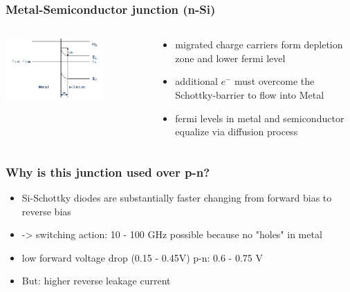 \documentclass[aspectratio=1610, 9pt]{beamer}
\begin{document}
\begin{frame}\frametitle{Metal-Semiconductor junction (n-Si)}
  \begin{columns}
    \begin{column}[c]{0.48\textwidth}
      \includegraphics[width=0.7\textwidth]{plots/post_m_s.png}
    \end{column}
    \begin{column}[c]{0.48\textwidth}
      \begin{itemize}
        \item migrated charge carriers form depletion zone and lower fermi level
        \item additional $e^{-}$ must overcome the Schottky-barrier to flow into Metal
        \item fermi levels in metal and semiconductor equalize via diffusion process
      \end{itemize}
    \end{column}
  \end{columns}
\end{frame}

\begin{frame}\frametitle{Why is this junction used over p-n?}
  \begin{itemize}
    \item Si-Schottky diodes are substantially faster changing from forward bias to reverse bias
    \item -> switching action: 10 - 100 GHz possible because no "holes" in metal
    \item low forward voltage drop (0.15 - 0.45V) p-n: 0.6 - 0.75 V
    \item But: higher reverse leakage current
  \end{itemize}
\end{frame}
\end{document}
